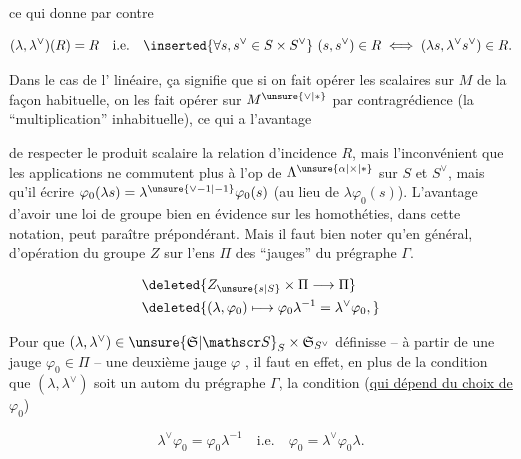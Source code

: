 
ce qui donne par contre

\[
(\lambda,\lambda^\vee)(R)=R\quad\text{i.e.}\quad
\inserted{\forall s,s^\vee\in S\times S^\vee}\ (s,s^\vee)\in R\iff(\lambda s,\lambda^\vee s^\vee)\in R.
\]

Dans le cas de l' linéaire, ça signifie que si on fait opérer les scalaires \inserted{$\in\Lambda^*$} sur $M$ de la façon habituelle, on les fait opérer sur $M^{\unsure{\vee|*}}$ par contragrédience (la ``multiplication'' inhabituelle), ce qui a l'avantage


de respecter le produit scalaire  la relation d'incidence $R$, mais l'inconvénient que les applications ne commutent plus à l'op de $\Lambda^{\unsure{\alpha|\times|*}}$ sur  $S$ et $S^\vee$, mais qu'il  écrire $\varphi_0(\lambda s)=\lambda^{\unsure{\vee-1|-1}}\varphi_0(s)$ (au lieu de $\lambda\varphi_0(s)$). L'avantage d'avoir une loi de groupe bien en évidence sur les homothéties, dans cette notation, peut paraître prépondérant. Mais il faut bien noter qu'en général,  d'opération du groupe $Z$ sur l'ens $\Pi$ des ``jauges'' du prégraphe $\Gamma$.


\[
\begin{aligned}
&\deleted{Z_{\unsure{s|S}}\times\Pi\longrightarrow\Pi}\\
&\deleted{(\lambda,\varphi_0)\longmapsto\varphi_0\lambda^{-1}=\lambda^\vee\varphi_0,}
\end{aligned}
\]

Pour que $(\lambda,\lambda^\vee)\in\unsure{\mathfrak S|\mathscr S}_S\times\mathfrak S_{S^\vee}$ définisse  -- à partir de  une jauge $\varphi_0\in\Pi$ -- une deuxième jauge $\varphi$ , il faut en effet, en plus de la condition que $(\lambda,\lambda^\vee)$ soit un autom du prégraphe $\Gamma$, la condition (\uline{qui dépend du choix de $\varphi_0$})

\[
\lambda^\vee\varphi_0=\varphi_0\lambda^{-1}\quad\text{i.e.}\quad\varphi_0=\lambda^\vee\varphi_0\lambda. \tag*{(65)}
\]

